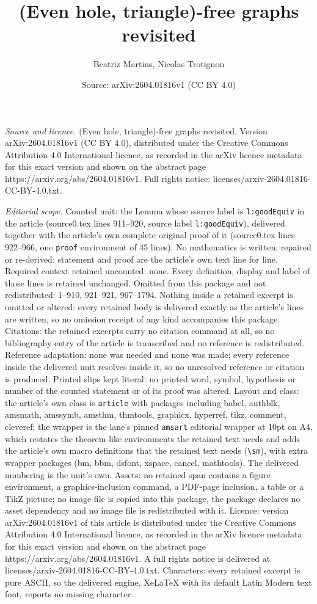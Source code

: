 \documentclass[10pt,a4paper]{amsart}
\title[(Even hole, triangle)-free graphs revisited]{(Even hole, triangle)-free graphs revisited}
\author{Beatriz Martins, Nicolas Trotignon}
\date{Source: arXiv:2604.01816v1 (CC BY 4.0)}
\begin{document}
\maketitle

\noindent\emph{Source and licence.} (Even hole, triangle)-free graphs revisited. Version arXiv:2604.01816v1 (CC BY 4.0), distributed under the Creative Commons Attribution 4.0 International licence, as recorded in the arXiv licence metadata for this exact version and shown on the abstract page https://arxiv.org/abs/2604.01816v1. Full rights notice: licenses/arxiv-2604.01816-CC-BY-4.0.txt.\par\smallskip

\noindent\textit{Editorial scope.} Counted unit: the Lemma whose source label is \texttt{l:goodEquiv} in the article (source0.tex lines 911--920, source label \texttt{l:goodEquiv}), delivered together with the article's own complete original proof of it (source0.tex lines 922--966, one \texttt{proof} environment of 45 lines). No mathematics is written, repaired or re-derived: statement and proof are the article's own text line for line. Required context retained uncounted: none. Every definition, display and label of those lines is retained unchanged. Omitted from this package and not redistributed: 1--910, 921--921, 967--1794. Nothing inside a retained excerpt is omitted or altered: every retained body is delivered exactly as the article's lines are written, so no omission receipt of any kind accompanies this package. Citations: the retained excerpts carry no citation command at all, so no bibliography entry of the article is transcribed and no reference is redistributed. Reference adaptation: none was needed and none was made; every reference inside the delivered unit resolves inside it, so no unresolved reference or citation is produced. Printed slips kept literal: no printed word, symbol, hypothesis or number of the counted statement or of its proof was altered. Layout and class: the article's own class is \texttt{article} with packages including babel, authblk, amsmath, amssymb, amsthm, thmtools, graphicx, hyperref, tikz, comment, cleveref; the wrapper is the lane's pinned \texttt{amsart} editorial wrapper at 10pt on A4, which restates the theorem-like environments the retained text needs and adds the article's own macro definitions that the retained text needs (\texttt{\textbackslash sm}), with extra wrapper packages (bm, bbm, dsfont, xspace, cancel, mathtools). The delivered numbering is the unit's own. Assets: no retained span contains a figure environment, a graphics-inclusion command, a PDF-page inclusion, a table or a TikZ picture; no image file is copied into this package, the package declares no asset dependency and no image file is redistributed with it. Licence: version arXiv:2604.01816v1 of this article is distributed under the Creative Commons Attribution 4.0 International licence, as recorded in the arXiv licence metadata for this exact version and shown on the abstract page https://arxiv.org/abs/2604.01816v1. A full rights notice is delivered at licenses/arxiv-2604.01816-CC-BY-4.0.txt. Characters: every retained excerpt is pure ASCII, so the delivered engine, XeLaTeX with its default Latin Modern text font, reports no missing character.
\end{document}

